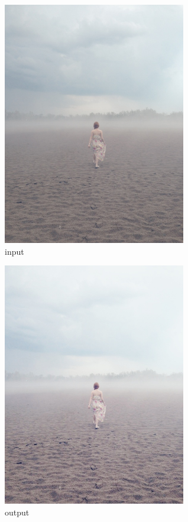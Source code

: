 \documentclass[12pt,a4paper]{article}
\theoremstyle{definition}
\theoremstyle{remark}
\theoremstyle{plain}
\begin{document}
\begin{multicols}{2}
\begin{figure}[H]
\centering
\includegraphics[width=8cm]{images/woman.jpeg}
  \caption{input}\label{river}
\end{figure}
\columnbreak
\begin{figure}[H]
\centering
\includegraphics[width=8cm]{images/fuzzy_color_2.jpg}
  \caption{output}\label{woman_output}
\end{figure}
\end{multicols}
\end{document}
